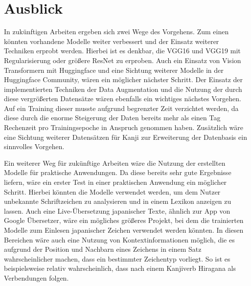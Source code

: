\documentclass[twoside,a4paper]{IEEEtran}
\begin{document}
\section{Ausblick}
In zukünftigen Arbeiten ergeben sich zwei Wege des Vorgehens. Zum einen könnten vorhandene Modelle weiter verbessert und der Einsatz weiterer Techniken erprobt werden. Hierbei ist es denkbar, die VGG16 und VGG19 mit Regularisierung oder größere ResNet zu erproben. Auch ein Einsatz von Vision Transformern mit Huggingface und eine Sichtung weiterer Modelle in der Huggingface Community, wären ein möglicher nächster Schritt. Der Einsatz der implementierten Techniken der Data Augmentation und die Nutzung der durch diese vergrößerten Datensätze wären ebenfalls ein wichtiges nächstes Vorgehen. Auf ein Training dieser musste aufgrund begrenzter Zeit verzichtet werden, da diese durch die enorme Steigerung der Daten bereits mehr als einen Tag Rechenzeit pro Trainingsepoche in Anspruch genommen haben. Zusätzlich wäre eine Sichtung weiterer Datensätzen für Kanji zur Erweiterung der Datenbasis ein sinnvolles Vorgehen.

Ein weiterer Weg für zukünftige Arbeiten wäre die Nutzung der erstellten Modelle für praktische Anwendungen. Da diese bereits sehr gute Ergebnisse liefern, wäre ein erster Test in einer praktischen Anwendung ein möglicher Schritt. Hierbei könnten die Modelle verwendet werden, um dem Nutzer unbekannte Schriftzeichen zu analysieren und in einem Lexikon anzeigen zu lassen. Auch eine Live-Übersetzung japanischer Texte, ähnlich zur App von Google Übersetzer, wäre ein mögliches größeres Projekt, bei dem die trainierten Modelle zum Einlesen japanischer Zeichen verwendet werden könnten. In diesen Bereichen wäre auch eine Nutzung von Kontextinformationen möglich, die es aufgrund der Position und Nachbarn eines Zeichens in einem Satz wahrscheinlicher machen, dass ein bestimmter Zeichentyp vorliegt. So ist es beispielsweise relativ wahrscheinlich, dass nach einem Kanjiverb Hiragana als Verbendungen folgen.



%
%
\end{document}
